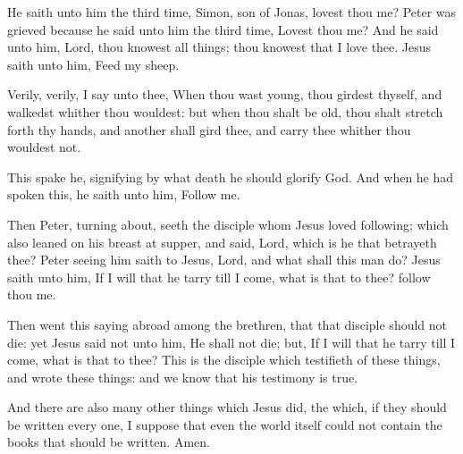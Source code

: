 \verse He saith unto him the third time, Simon, son of Jonas, lovest thou me? Peter was grieved because he said unto him the third time, Lovest thou me? And he said unto him, Lord, thou knowest all things; thou knowest that I love thee. Jesus saith unto him, Feed my sheep.

\verse Verily, verily, I say unto thee, When thou wast young, thou girdest thyself, and walkedst whither thou wouldest: but when thou shalt be old, thou shalt stretch forth thy hands, and another shall gird thee, and carry thee whither thou wouldest not.

\verse This spake he, signifying by what death he should glorify God.  And when he had spoken this, he saith unto him, Follow me.

\verse Then Peter, turning about, seeth the disciple whom Jesus loved following; which also leaned on his breast at supper, and said, Lord, which is he that betrayeth thee?  \verse Peter seeing him saith to Jesus, Lord, and what shall this man do?  \verse Jesus saith unto him, If I will that he tarry till I come, what is that to thee? follow thou me.

\verse Then went this saying abroad among the brethren, that that disciple should not die: yet Jesus said not unto him, He shall not die; but, If I will that he tarry till I come, what is that to thee?  \verse This is the disciple which testifieth of these things, and wrote these things: and we know that his testimony is true.

\verse And there are also many other things which Jesus did, the which, if they should be written every one, I suppose that even the world itself could not contain the books that should be written. Amen.

